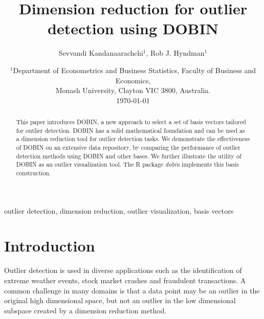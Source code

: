 \documentclass[letter,12pt]{article}
\begin{document}

\title{Dimension reduction for outlier detection using DOBIN}
\author{Sevvandi Kandanaarachchi$^1$, Rob J. Hyndman$^1$}
\date{%
   \scriptsize{ $^1$Department of Econometrics and Business Statistics, Faculty of Business and Economics, \\ Monash University, Clayton VIC 3800, Australia.\\ [2ex]}%
    \today \\
}
\begin{titlingpage}
\maketitle

\begin{abstract}
	This paper introduces DOBIN, a new approach to select a set of basis vectors tailored for outlier detection. DOBIN has a solid mathematical foundation and can be used as a dimension reduction tool for outlier detection tasks. We demonstrate the effectiveness of DOBIN on an extensive data repository, by comparing the performance of outlier detection methods using DOBIN and other bases. We further illustrate the utility of DOBIN as an outlier visualization tool. The R package \textit{dobin} implements this basis construction.
\end{abstract}

\begin{keywords}outlier detection, dimension reduction, outlier visualization, basis vectors
\end{keywords}

\end{titlingpage}

\section{Introduction}

Outlier detection is used in diverse applications such as the identification of extreme weather events, stock market crashes and fraudulent transactions. A common challenge in many domains is that a data point may be an outlier in the original high dimensional space, but not an outlier in the low dimensional subspace created by a dimension reduction method.
\end{document}
